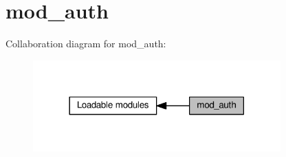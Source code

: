 \hypertarget{group__MOD__AUTH}{}\section{mod\+\_\+auth}
\label{group__MOD__AUTH}
Collaboration diagram for mod\+\_\+auth\+:
\nopagebreak
\begin{figure}[H]
\begin{center}
\leavevmode
\includegraphics[width=270pt]{group__MOD__AUTH}
\end{center}
\end{figure}
